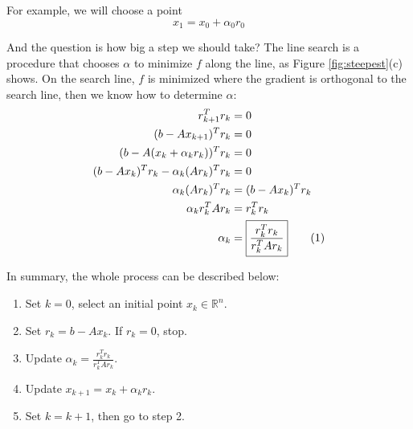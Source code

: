 \documentclass{article}
\newcommand\numberthis{\addtocounter{equation}{1}\tag{\theequation}}
\begin{document}
For example, we will choose a point
\begin{equation}
    x_1=x_0+\alpha_0 r_0
\end{equation}

And the question is how big a step we should take? The line search is a procedure that chooses $\alpha$ to minimize $f$ along the line, as Figure \ref{fig:steepest}(c) shows. On the search line, $f$ is minimized where the gradient is orthogonal to the search line, then we know how to determine $\alpha$:
\begin{align*}
    r_{k+1}^Tr_k&=0\\
    (b-Ax_{k+1})^Tr_k&=0\\
    (b-A(x_k+\alpha_kr_k))^Tr_k&=0\\
    (b-Ax_k)^Tr_k-\alpha_k(Ar_k)^Tr_k&=0\\
    \alpha_k(Ar_k)^Tr_k&=(b-Ax_k)^Tr_k\\
    \alpha_kr_k^TAr_k&=r_k^Tr_k\\
    \alpha_k&=\boxed{\frac{r_k^Tr_k}{r_k^TAr_k}} \numberthis
\end{align*}

In summary, the whole process can be described below:
\begin{enumerate}
\item Set $k=0$, select an initial point $x_k\in\mathbb{R}^n$.
\item Set $r_k=b-Ax_k$. If $ r_k=0$, stop.
\item Update $\alpha_k=\frac{r_k^Tr_k}{r_k^TAr_k}$.
\item Update $x_{k+1}=x_k+\alpha_kr_k$.
\item Set $k=k+1$, then go to step 2.
\end{enumerate}
\end{document}
